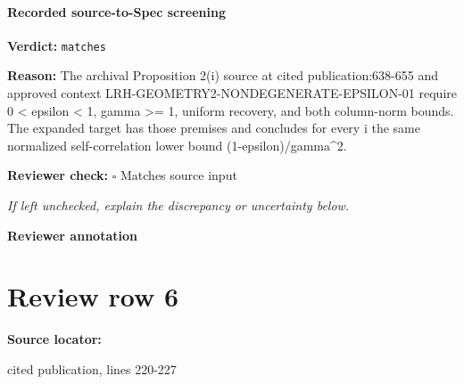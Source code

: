 \documentclass[10pt]{article}
\newcommand{\reviewerbox}{%
  \par\noindent\fbox{\parbox{0.96\linewidth}{\rule{0pt}{0.38in}}}\par
}
\newcommand{\reviewmatch}[1]{%
  \par\noindent\textbf{Reviewer check:} $\square$\; #1\par
  \noindent\emph{If left unchecked, explain the discrepancy or uncertainty below.}\par
}
\begin{document}
\paragraph{Recorded source-to-Spec screening}
\textbf{Verdict:} \texttt{matches}
\\
{\raggedright
\textbf{Reason:} The archival Proposition 2(i) source at cited publication:\allowbreak{}638-\allowbreak{}655 and approved context LRH-\allowbreak{}GEOMETRY2-\allowbreak{}NONDEGENERATE-\allowbreak{}EPSILON-\allowbreak{}01 require 0 < epsilon < 1, gamma >= 1, uniform recovery, and both column-\allowbreak{}norm bounds.\allowbreak{} The expanded target has those premises and concludes for every i the same normalized self-\allowbreak{}correlation lower bound (1-\allowbreak{}epsilon)/\allowbreak{}gamma\textasciicircum{}2.\allowbreak{}
\par}
\reviewmatch{Matches source input}
\noindent\textbf{Reviewer annotation}\par
\reviewerbox
\clearpage
\hypertarget{source-claim-a09ca6c3835d7786}{}
\section*{Review row 6}
\textbf{Source locator:} {\footnotesize\raggedright cited publication, lines 220-\allowbreak{}227\par}
\end{document}
